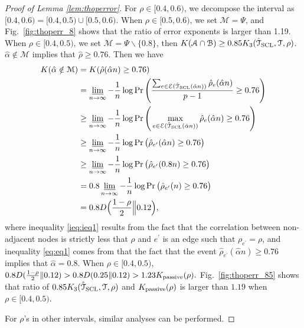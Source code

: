 \documentclass[11pt,onecolumn]{article}
\newcommand{\calA}{\mathcal{A}}
\newcommand{\calB}{\mathcal{B}}
\newcommand{\calE}{\mathcal{E}}
\newcommand{\calM}{\mathcal{M}}
\newcommand{\calT}{\mathcal{T}}
\newcommand{\hatcalT}{\hat{\calT}}
\newcommand{\halpha}{\hat{\alpha}}
\newcommand{\hrho}{\hat{\rho}}
\newcommand{\Passive}{{\rm passive}}
\begin{document}
\begin{proof}[Proof of Lemma \ref{lem:thoperror}]
	For $\rho\in[0.4,0.6)$, we decompose the interval as $[0.4,0.6)=[0.4,0.5)\cup [0.5,0.6)$. When $\rho\in[0.5,0.6)$, we set $\calM=\Psi$, and Fig.~\ref{fig:thoperr_8} 
	shows that the ratio of error exponents is larger than 1.19. When $\rho\in[0.4,0.5)$, we set $\calM=\Psi\backslash\{0.8\}$, then $K ( \calA\cap \calB)\geq 0.85K _{3}(\hatcalT_{{\rm SCL}},\calT,\rho)$. $\halpha\notin \calM$ implies that $\hrho \geq 0.76$. Then we have
	\begin{align}
		K (\halpha\notin \calM)&=K (\hrho(\halpha n)\geq 0.76)\\*
		&=\varliminf_{n\rightarrow \infty}-\frac{1}{n}\log\Pr\Bigg(\frac{\sum_{e\in\calE (\hatcalT_{{\rm SCL}}(\halpha n) )}\hrho_{e}(\halpha n)}{p-1}\geq 0.76\Bigg)\\
		&\geq\varliminf_{n\rightarrow \infty}-\frac{1}{n}\log\Pr\Bigg(\max_{e\in\calE (\hatcalT_{{\rm SCL}}(\halpha n) )}\hrho_{e}(\halpha n)\geq 0.76\Bigg)\\
		&\geq \varliminf_{n\rightarrow \infty}-\frac{1}{n}\log\Pr\big(\hrho_{e^{\prime}}(\halpha n)\geq 0.76\big) \label{ieq:ieq1}\\
		&\geq \varliminf_{n\rightarrow \infty}-\frac{1}{n}\log\Pr\big(\hrho_{e^{\prime}}(0.8n)\geq 0.76\big) \label{eq:eq1}\\
		&= 0.8\varliminf_{n\rightarrow \infty}-\frac{1}{n}\log\Pr\big(\hrho_{e^{\prime}}(n)\geq 0.76\big)\\
		&= 0.8D\Big(\frac{1-\rho}{2}\Big\|0.12\Big),
	\end{align}
	where inequality \eqref{ieq:ieq1} results from the fact that the correlation between non-adjacent nodes is strictly less that $\rho$ and $e^{\prime}$ is an edge such that $\rho_{e^{\prime}}=\rho$, and inequality \eqref{eq:eq1} comes from that the fact that the event $\hrho_{e^{\prime}}(\halpha n)\geq 0.76$ implies that $\halpha=0.8$. When $\rho\in[0.4,0.5)$, $0.8D(\frac{1-\rho}{2}\|0.12)>0.8D(0.25\|0.12)>1.23K _{\Passive}(\rho).$
	Fig.~\ref{fig:thoperr_85} shows that ratio of $0.85K _{3}(\hatcalT_{{\rm SCL}},\calT,\rho)$ and $K _{\Passive}(\rho)$ is larger than $1.19$ when $\rho\in[0.4,0.5)$.

	For $\rho$'s in other intervals, similar analyses can be performed.
\end{proof}
\end{document}
